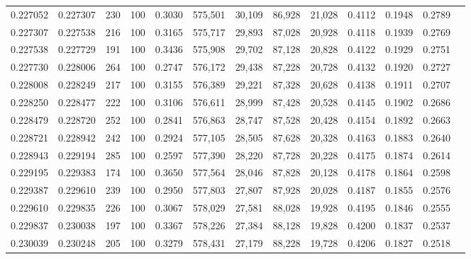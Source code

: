 \begin{tabular}{rrrrrrrrrrrrr}
0.227052 & 0.227307 &   230 & 100 &                                     0.3030 & 575,501 &  30,109 &  86,928 &  21,028 & 0.4112 & 0.1948 & 0.2789 \\
0.227307 & 0.227538 &   216 & 100 &                                     0.3165 & 575,717 &  29,893 &  87,028 &  20,928 & 0.4118 & 0.1939 & 0.2769 \\
0.227538 & 0.227729 &   191 & 100 &                                     0.3436 & 575,908 &  29,702 &  87,128 &  20,828 & 0.4122 & 0.1929 & 0.2751 \\
0.227730 & 0.228006 &   264 & 100 &                                     0.2747 & 576,172 &  29,438 &  87,228 &  20,728 & 0.4132 & 0.1920 & 0.2727 \\
0.228008 & 0.228249 &   217 & 100 &                                     0.3155 & 576,389 &  29,221 &  87,328 &  20,628 & 0.4138 & 0.1911 & 0.2707 \\
0.228250 & 0.228477 &   222 & 100 &                                     0.3106 & 576,611 &  28,999 &  87,428 &  20,528 & 0.4145 & 0.1902 & 0.2686 \\
0.228479 & 0.228720 &   252 & 100 &                                     0.2841 & 576,863 &  28,747 &  87,528 &  20,428 & 0.4154 & 0.1892 & 0.2663 \\
0.228721 & 0.228942 &   242 & 100 &                                     0.2924 & 577,105 &  28,505 &  87,628 &  20,328 & 0.4163 & 0.1883 & 0.2640 \\
0.228943 & 0.229194 &   285 & 100 &                                     0.2597 & 577,390 &  28,220 &  87,728 &  20,228 & 0.4175 & 0.1874 & 0.2614 \\
0.229195 & 0.229383 &   174 & 100 &                                     0.3650 & 577,564 &  28,046 &  87,828 &  20,128 & 0.4178 & 0.1864 & 0.2598 \\
0.229387 & 0.229610 &   239 & 100 &                                     0.2950 & 577,803 &  27,807 &  87,928 &  20,028 & 0.4187 & 0.1855 & 0.2576 \\
0.229610 & 0.229835 &   226 & 100 &                                     0.3067 & 578,029 &  27,581 &  88,028 &  19,928 & 0.4195 & 0.1846 & 0.2555 \\
0.229837 & 0.230038 &   197 & 100 &                                     0.3367 & 578,226 &  27,384 &  88,128 &  19,828 & 0.4200 & 0.1837 & 0.2537 \\
0.230039 & 0.230248 &   205 & 100 &                                     0.3279 & 578,431 &  27,179 &  88,228 &  19,728 & 0.4206 & 0.1827 & 0.2518 \\

\end{tabular}
